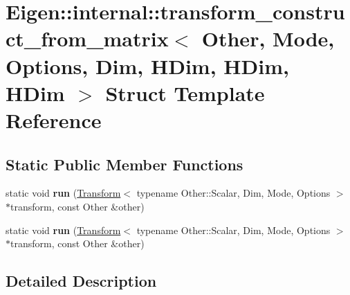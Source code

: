 \hypertarget{struct_eigen_1_1internal_1_1transform__construct__from__matrix_3_01_other_00_01_mode_00_01_optioafd8e88ef382fcf70f7e3dd5fcd9f415}{}\section{Eigen\+:\+:internal\+:\+:transform\+\_\+construct\+\_\+from\+\_\+matrix$<$ Other, Mode, Options, Dim, H\+Dim, H\+Dim, H\+Dim $>$ Struct Template Reference}
\label{struct_eigen_1_1internal_1_1transform__construct__from__matrix_3_01_other_00_01_mode_00_01_optioafd8e88ef382fcf70f7e3dd5fcd9f415}
\subsection*{Static Public Member Functions}
\begin{DoxyCompactItemize}
\item 
\mbox{\label{struct_eigen_1_1internal_1_1transform__construct__from__matrix_3_01_other_00_01_mode_00_01_optioafd8e88ef382fcf70f7e3dd5fcd9f415_a48de7daffd0a823a050a8c3410624af7}} 
static void {\bfseries run} (\hyperlink{group___geometry___module_class_eigen_1_1_transform}{Transform}$<$ typename Other\+::\+Scalar, Dim, Mode, Options $>$ $\ast$transform, const Other \&other)
\item 
\mbox{\label{struct_eigen_1_1internal_1_1transform__construct__from__matrix_3_01_other_00_01_mode_00_01_optioafd8e88ef382fcf70f7e3dd5fcd9f415_a48de7daffd0a823a050a8c3410624af7}} 
static void {\bfseries run} (\hyperlink{group___geometry___module_class_eigen_1_1_transform}{Transform}$<$ typename Other\+::\+Scalar, Dim, Mode, Options $>$ $\ast$transform, const Other \&other)
\end{DoxyCompactItemize}


\subsection{Detailed Description}
